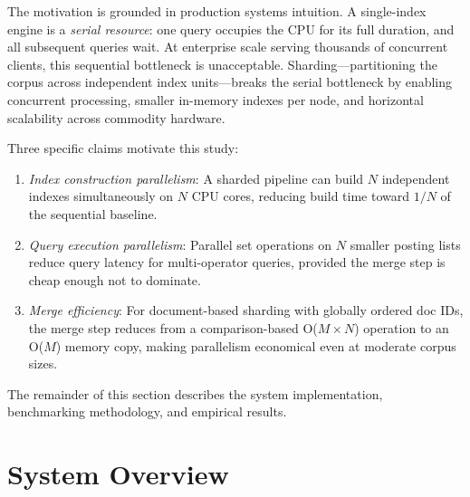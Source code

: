 \documentclass[twocolumn, 10pt]{article}
\begin{document}
The motivation is grounded in production systems intuition. A single-index
engine is a \textit{serial resource}: one query occupies the CPU for its
full duration, and all subsequent queries wait. At enterprise scale serving
thousands of concurrent clients, this sequential bottleneck is unacceptable.
Sharding---partitioning the corpus across independent index units---breaks
the serial bottleneck by enabling concurrent processing, smaller in-memory
indexes per node, and horizontal scalability across commodity hardware.

Three specific claims motivate this study:

\begin{enumerate}[leftmargin=*, noitemsep]
    \item \textit{Index construction parallelism}: A sharded pipeline can
    build $N$ independent indexes simultaneously on $N$ CPU cores, reducing
    build time toward $1/N$ of the sequential baseline.
    \item \textit{Query execution parallelism}: Parallel set operations on
    $N$ smaller posting lists reduce query latency for multi-operator queries,
    provided the merge step is cheap enough not to dominate.
    \item \textit{Merge efficiency}: For document-based sharding with
    globally ordered doc IDs, the merge step reduces from a
    comparison-based O($M \times N$) operation to an O($M$) memory copy,
    making parallelism economical even at moderate corpus sizes.
\end{enumerate}

The remainder of this section describes the system implementation,
benchmarking methodology, and empirical results.

\section{System Overview}
\end{document}
